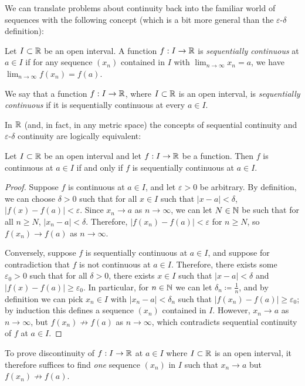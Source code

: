 \documentclass[../analysis1.tex]{subfiles}
\begin{document}
We can translate problems about continuity back into the familiar world of sequences with the following concept (which is a bit more general than the $\varepsilon$-$\delta$ definition):
\begin{definition}
    \begin{shaded*}
        Let $I\subset\mathbb{R}$ be an open interval. A function $f:I\to\mathbb{R}$ is \textit{sequentially continuous} at $a\in I$ if for any sequence $(x_n)$ contained in $I$ with $\lim_{n\to\infty}x_n=a$, we have $\lim_{n\to\infty}f(x_n)=f(a)$.
    \end{shaded*}
\end{definition}
\begin{remark}
    We say that a function $f:I\to\mathbb{R}$, where $I\subset\mathbb{R}$ is an open interval, is \textit{sequentially continuous} if it is sequentially continuous at every $a\in I$.
\end{remark}
In $\mathbb{R}$ (and, in fact, in any metric space) the concepts of sequential continuity and $\varepsilon$-$\delta$ continuity are logically equivalent:
\begin{theorem}
\label{thm:sequentialcontinuity}
    \begin{shaded*}
        Let $I\subset\mathbb{R}$ be an open interval and let $f:I\to\mathbb{R}$ be a function. Then $f$ is continuous at $a\in I$ if and only if $f$ is sequentially continuous at $a\in I$.
    \end{shaded*}
\end{theorem}
\begin{proof}
    Suppose $f$ is continuous at $a\in I$, and let $\varepsilon>0$ be arbitrary. By definition, we can choose $\delta>0$ such that for all $x\in I$ such that $|x-a|<\delta$, $|f(x)-f(a)|<\varepsilon$. Since $x_n\to a$ as $n\to\infty$, we can let $N\in\mathbb{N}$ be such that for all $n\ge N$, $|x_n-a|<\delta$. Therefore, $|f(x_n)-f(a)|<\varepsilon$ for $n\ge N$, so $f(x_n)\to f(a)$ as $n\to\infty$.\par
    Conversely, suppose $f$ is sequentially continuous at $a\in I$, and suppose for contradiction that $f$ is not continuous at $a\in I$. Therefore, there exists some $\varepsilon_0>0$ such that for all $\delta>0$, there exists $x\in I$ such that $|x-a|<\delta$ and $|f(x)-f(a)|\ge \varepsilon_0$. In particular, for $n\in\mathbb{N}$ we can let $\delta_n\coloneqq\frac{1}{n}$, and by definition we can pick $x_n\in I$ with $|x_n-a|<\delta_n$ such that $|f(x_n)-f(a)|\ge \varepsilon_0$; by induction this defines a sequence $(x_n)$ contained in $I$. However, $x_n\to a$ as $n\to\infty$, but $f(x_n)\not\to f(a)$ as $n\to\infty$, which contradicts sequential continuity of $f$ at $a\in I$.\qedhere
\end{proof}
\begin{remark}
    To prove discontinuity of $f:I\to \mathbb{R}$ at $a\in I$ where $I\subset\mathbb{R}$ is an open interval, it therefore suffices to find \textit{one} sequence $(x_n)$ in $I$ such that $x_n\to a$ but $f(x_n)\not\to f(a)$.
\end{remark}
\end{document}
